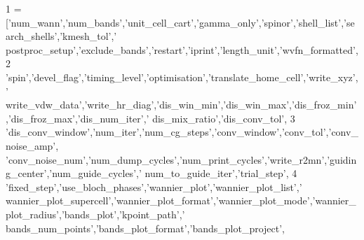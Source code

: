 \begin{DoxyCode}
1 = [\textcolor{stringliteral}{'num\_wann'},\textcolor{stringliteral}{'num\_bands'},\textcolor{stringliteral}{'unit\_cell\_cart'},\textcolor{stringliteral}{'gamma\_only'},\textcolor{stringliteral}{'spinor'},\textcolor{stringliteral}{'shell\_list'},\textcolor{stringliteral}{'search\_shells'},\textcolor{stringliteral}{'kmesh\_tol'},\textcolor{stringliteral}{'
      postproc\_setup'},\textcolor{stringliteral}{'exclude\_bands'},\textcolor{stringliteral}{'restart'},\textcolor{stringliteral}{'iprint'},\textcolor{stringliteral}{'length\_unit'},\textcolor{stringliteral}{'wvfn\_formatted'},
2                      \textcolor{stringliteral}{'spin'},\textcolor{stringliteral}{'devel\_flag'},\textcolor{stringliteral}{'timing\_level'},\textcolor{stringliteral}{'optimisation'},\textcolor{stringliteral}{'translate\_home\_cell'},\textcolor{stringliteral}{'write\_xyz'},\textcolor{stringliteral}{'
      write\_vdw\_data'},\textcolor{stringliteral}{'write\_hr\_diag'},\textcolor{stringliteral}{'dis\_win\_min'},\textcolor{stringliteral}{'dis\_win\_max'},\textcolor{stringliteral}{'dis\_froz\_min'},\textcolor{stringliteral}{'dis\_froz\_max'},\textcolor{stringliteral}{'dis\_num\_iter'},\textcolor{stringliteral}{'
      dis\_mix\_ratio'},\textcolor{stringliteral}{'dis\_conv\_tol'},
3                      \textcolor{stringliteral}{'dis\_conv\_window'},\textcolor{stringliteral}{'num\_iter'},\textcolor{stringliteral}{'num\_cg\_steps'},\textcolor{stringliteral}{'conv\_window'},\textcolor{stringliteral}{'conv\_tol'},\textcolor{stringliteral}{'conv\_noise\_amp'},\textcolor{stringliteral}{
      'conv\_noise\_num'},\textcolor{stringliteral}{'num\_dump\_cycles'},\textcolor{stringliteral}{'num\_print\_cycles'},\textcolor{stringliteral}{'write\_r2mn'},\textcolor{stringliteral}{'guiding\_center'},\textcolor{stringliteral}{'num\_guide\_cycles'},\textcolor{stringliteral}{'
      num\_to\_guide\_iter'},\textcolor{stringliteral}{'trial\_step'},
4                      \textcolor{stringliteral}{'fixed\_step'},\textcolor{stringliteral}{'use\_bloch\_phases'},\textcolor{stringliteral}{'wannier\_plot'},\textcolor{stringliteral}{'wannier\_plot\_list'},\textcolor{stringliteral}{'
      wannier\_plot\_supercell'},\textcolor{stringliteral}{'wannier\_plot\_format'},\textcolor{stringliteral}{'wannier\_plot\_mode'},\textcolor{stringliteral}{'wannier\_plot\_radius'},\textcolor{stringliteral}{'bands\_plot'},\textcolor{stringliteral}{'kpoint\_path'},\textcolor{stringliteral}{'
      bands\_num\_points'},\textcolor{stringliteral}{'bands\_plot\_format'},\textcolor{stringliteral}{'bands\_plot\_project'},

\end{DoxyCode}
